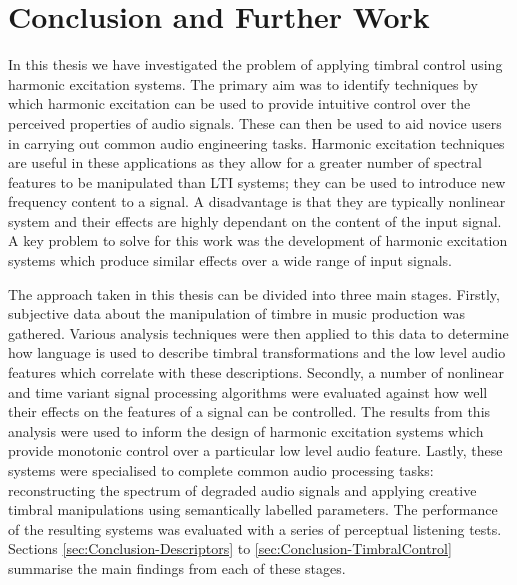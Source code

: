 \chapter{Conclusion and Further Work}
\label{chap:Conclusion}

	In this	thesis we have investigated the problem of applying timbral control using harmonic excitation systems. The
	primary aim was to identify techniques by which harmonic excitation can be used to provide intuitive control over
	the perceived properties of audio signals. These can then be used to aid novice users in carrying out common audio
	engineering tasks. Harmonic excitation techniques are useful in these applications as they allow for a greater
	number of spectral features to be manipulated than LTI systems; they can be used to introduce new frequency
	content to a signal. A disadvantage is that they are typically nonlinear system and their effects are highly
	dependant on the content of the input signal. A key problem to solve for this work was the development of harmonic
	excitation systems which produce similar effects over a wide range of input signals.

	The approach taken in this thesis can be divided into three main stages. Firstly, subjective data about the
	manipulation of timbre in music production was gathered. Various analysis techniques were then applied to this data
	to determine how language is used to describe timbral transformations and the low level audio features which
	correlate with these descriptions. Secondly, a number of nonlinear and time variant signal processing algorithms
	were evaluated against how well their effects on the features of a signal can be controlled. The results from this
	analysis were used to inform the design of harmonic excitation systems which provide monotonic control over a
	particular low level audio feature. Lastly, these systems were specialised to complete common audio processing
	tasks: reconstructing the spectrum of degraded audio signals and applying creative timbral manipulations using
	semantically labelled parameters. The performance of the resulting systems was evaluated with a series of perceptual
	listening tests. Sections \ref{sec:Conclusion-Descriptors} to \ref{sec:Conclusion-TimbralControl} summarise the main
	findings from each of these stages.

